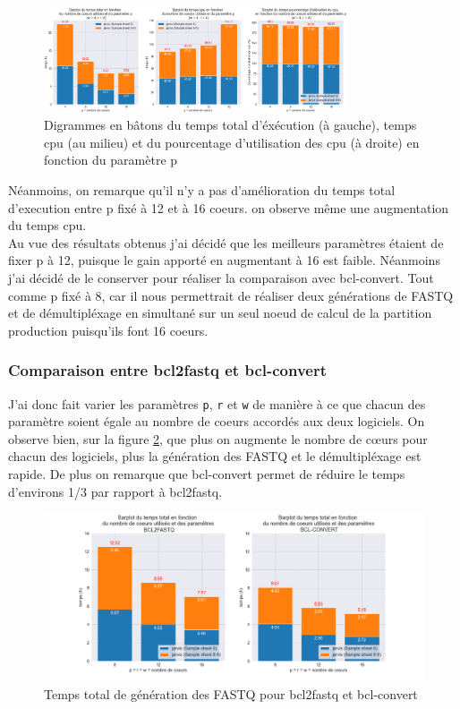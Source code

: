 \begin{figure}[H]
    \centering
    \includegraphics[width=0.8\textwidth]{img/barplot_cum_jarvis1.png}
    \caption{\footnotesize{Digrammes en bâtons du temps total d'éxécution (à gauche), temps cpu (au milieu) et du pourcentage d'utilisation des cpu (à droite) en fonction du paramètre p}}
    \label{barplot-param2}
\end{figure}

Néanmoins, on remarque qu'il n'y a pas d'amélioration du temps total d'execution entre p fixé à 12 et à 16 coeurs. on observe même une augmentation du temps cpu.\\

Au vue des résultats obtenus j'ai décidé que les meilleurs paramètres étaient de fixer p à 12, puisque le gain apporté en augmentant à 16 est faible. Néanmoins j'ai décidé de le conserver pour réaliser la comparaison avec bcl-convert.
Tout comme p fixé à 8, car il nous permettrait de réaliser deux générations de FASTQ et de démultipléxage en simultané sur un seul noeud de calcul de la partition \og production\fg{} puisqu'ils font 16 coeurs.\\

\subsubsection*{Comparaison entre bcl2fastq et bcl-convert}
J'ai donc fait varier les paramètres \texttt{p}, \texttt{r} et \texttt{w} de manière à ce que chacun des paramètre soient égale au nombre de coeurs accordés aux deux logiciels. On observe bien, sur la figure \ref{fig-total-time}, que plus on augmente le nombre de cœurs pour chacun des logiciels, plus la génération des FASTQ et le démultipléxage est rapide. De plus on remarque que bcl-convert permet de réduire le temps d'environs 1/3 par rapport à bcl2fastq. 

\begin{figure}[H]
    \centering
    \includegraphics[width=1\textwidth]{img/barplot_total_time_comp.png}
    \caption{\footnotesize{Temps total de génération des FASTQ pour bcl2fastq et bcl-convert}}
    \label{fig-total-time}
\end{figure}

